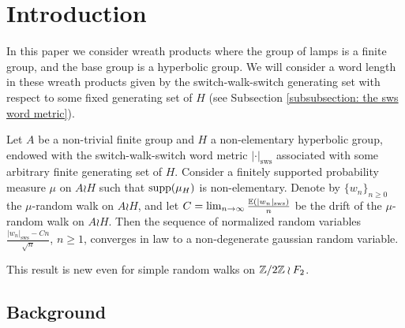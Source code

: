 \section{Introduction}
In this paper we consider wreath products where the group of lamps is a finite group, and the base group is a hyperbolic group. We will consider a word length in these wreath products given by the switch-walk-switch generating set with respect to some fixed generating set of $H$ (see Subsection \ref{subsubsection: the sws word metric}).

\begin{thm}\label{thm: main theorem CLT for word length for lamplighter over a hyperbolic base group}
	Let $A$ be a non-trivial finite group and $H$ a non-elementary hyperbolic group, endowed with the switch-walk-switch word metric $|\cdot|_{\mathrm{sws}}$ associated with some arbitrary finite generating set of $H$. Consider a finitely supported probability measure $\mu$ on $A\wr H$ such that $\mathrm{supp}(\mu_H)$ is non-elementary. Denote by $\{w_n\}_{n\ge 0}$ the $\mu$-random walk on $A\wr H$, and let $C=\lim_{n\to \infty}\frac{\mathbb{E}(|w_n|_{\mathrm{sws}})}{n}$ be the drift of the $\mu$-random walk on $A\wr H$. Then the sequence of normalized random variables $\frac{|w_n|_{\mathrm{sws}}-Cn}{\sqrt{n}}$, $n\ge 1$, converges in law to a non-degenerate gaussian random variable.
\end{thm}
This result is new even for simple random walks on $\mathbb{Z}/2\mathbb{Z}\wr F_2$.


\subsection{Background}

